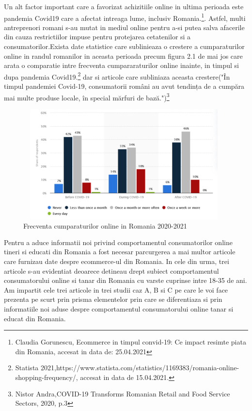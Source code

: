 \documentclass[a4paper, 12pt]{article}
\begin{document}
	\quad Un alt factor important care a favorizat achizitiile online in ultima perioada este pandemia Covid19 care a afectat intreaga lume, inclusiv Romania.\footnote{Claudia Gorunescu, Ecommerce in timpul convid-19: Ce impact resimte piata din Romania, accesat in data de: 25.04.2021}. Astfel, multi antreprenori romani s-au mutat in mediul online pentru a-si putea salva afacerile din cauza restrictiilor impuse pentru protejarea cetatenilor si a consumatorilor.Exista date statistice care sublinieaza o crestere a cumparaturilor online in randul romanilor in aceasta perioada precum figura 2.1 de mai jos care arata o comparatie intre frecventa cumpararaturilor online inainte, in timpul si dupa pandemia Covid19.\footnote{Statista 2021,https://www.statista.com/statistics/1169383/romania-online-shopping-frequency/, accesat in data de 15.04.2021.} dar si articole care subliniaza aceasta crestere("În timpul pandemiei Covid-19, consumatorii români au avut tendința de a cumpăra mai multe produse locale, în special mărfuri de bază.")\footnote{Nistor Andra,COVID-19 Transforms Romanian Retail and Food Service Sectors, 2020, p.3}
	 	\begin{figure}[!htb]
	 	\centering
	 	\includegraphics[width=11cm, height=6cm]{"figures/fourth.png"}
	 	\caption{ Frecventa cumparaturilor online in Romania 2020-2021}\label{fig:fourth}
		 \end{figure}
\newpage 
 \qquad Pentru a aduce informatii noi privind comportamentul consumatorilor online tineri si educati din Romania a fost necesar parcurgerea a mai multor articole care furnizau date despre ecommerce-ul din Romania. In cele din urma, trei articole s-au evidentiat deoarece detineau drept subiect comportamentul consumatorului online si tanar din Romania cu varste cuprinse intre 18-35 de ani. Am impartit cele trei articole in trei studii caz A, B si C pe care le voi face prezenta pe scurt prin prisma elementelor prin care se diferentiaza si prin informatiile noi aduse despre comportamentul consumatorului online tanar si educat din Romania.
\end{document}
